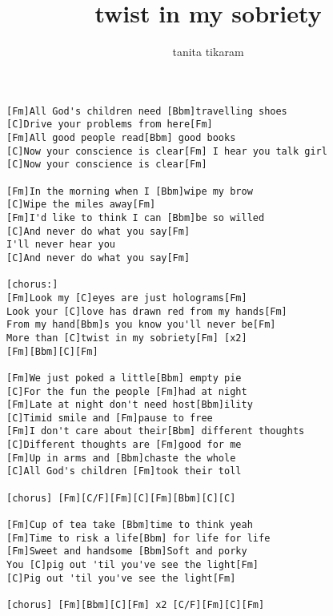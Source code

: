 \author{tanita tikaram}
\title{twist in my sobriety}
\maketitle
\begin{verbatim}
[Fm]All God's children need [Bbm]travelling shoes
[C]Drive your problems from here[Fm]
[Fm]All good people read[Bbm] good books
[C]Now your conscience is clear[Fm] I hear you talk girl
[C]Now your conscience is clear[Fm]

[Fm]In the morning when I [Bbm]wipe my brow
[C]Wipe the miles away[Fm]
[Fm]I'd like to think I can [Bbm]be so willed
[C]And never do what you say[Fm]
I'll never hear you
[C]And never do what you say[Fm]

[chorus:]
[Fm]Look my [C]eyes are just holograms[Fm]
Look your [C]love has drawn red from my hands[Fm]
From my hand[Bbm]s you know you'll never be[Fm]
More than [C]twist in my sobriety[Fm] [x2]
[Fm][Bbm][C][Fm]

[Fm]We just poked a little[Bbm] empty pie
[C]For the fun the people [Fm]had at night
[Fm]Late at night don't need host[Bbm]ility
[C]Timid smile and [Fm]pause to free
[Fm]I don't care about their[Bbm] different thoughts
[C]Different thoughts are [Fm]good for me
[Fm]Up in arms and [Bbm]chaste the whole
[C]All God's children [Fm]took their toll

[chorus] [Fm][C/F][Fm][C][Fm][Bbm][C][C]

[Fm]Cup of tea take [Bbm]time to think yeah
[Fm]Time to risk a life[Bbm] for life for life
[Fm]Sweet and handsome [Bbm]Soft and porky
You [C]pig out 'til you've see the light[Fm]
[C]Pig out 'til you've see the light[Fm]

[chorus] [Fm][Bbm][C][Fm] x2 [C/F][Fm][C][Fm]
\end{verbatim}
